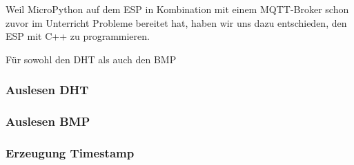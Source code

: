 Weil MicroPython auf dem ESP in Kombination mit einem MQTT-Broker schon 
zuvor im Unterricht Probleme bereitet hat, haben wir uns dazu entschieden, den ESP mit C++ zu programmieren.

Für sowohl den DHT als auch den BMP 

\subsubsection{Auslesen DHT}

\subsubsection{Auslesen BMP}

\subsubsection{Erzeugung Timestamp}